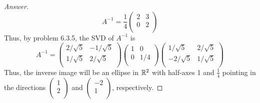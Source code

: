 \documentclass[../psets.tex]{subfiles}
\begin{document}
\begin{enumerate}[label={\textbf{3.\arabic*.}}]
\begin{proof}[Answer]
        \begin{equation*}
            A^{-1} = \frac{1}{4}
            \begin{pmatrix}
                2 & 3\\
                0 & 2\\
            \end{pmatrix}
        \end{equation*}
        Thus, by problem 6.3.5, the SVD of $A^{-1}$ is
        \begin{equation*}
            A^{-1} =
            \begin{pmatrix}
                2/\sqrt{5} & -1/\sqrt{5}\\
                1/\sqrt{5} & 2/\sqrt{5}\\
            \end{pmatrix}
            \begin{pmatrix}
                1 & 0\\
                0 & 1/4\\
            \end{pmatrix}
            \begin{pmatrix}
                1/\sqrt{5} & 2/\sqrt{5}\\
                -2/\sqrt{5} & 1/\sqrt{5}\\
            \end{pmatrix}
        \end{equation*}
        Thus, the inverse image will be an ellipse in $\mathbb{R}^2$ with half-axes 1 and $\frac{1}{4}$ pointing in the directions $
            \left(
                \begin{smallmatrix}
                    1\\
                    2\\
                \end{smallmatrix}
            \right)
        $ and $
            \left(
                \begin{smallmatrix}
                    -2\\
                    1\\
                \end{smallmatrix}
            \right)
        $, respectively.
    \end{proof}
\end{enumerate}
\end{document}
